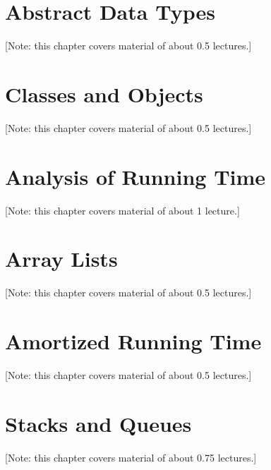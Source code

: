 \documentclass{book}
\begin{document}
\chapter{Abstract Data Types}
\label{chap:ADTs}
[Note: this chapter covers material of about 0.5 lectures.]

%

\chapter{Classes and Objects}
\label{chap:classes}
[Note: this chapter covers material of about 0.5 lectures.]

%

\chapter{Analysis of Running Time}
\label{chap:running-time}
[Note: this chapter covers material of about 1 lecture.]

%

\chapter{Array Lists}
\label{chap:arraylists}
[Note: this chapter covers material of about 0.5 lectures.]

%

\chapter{Amortized Running Time}
\label{chap:amortized}
[Note: this chapter covers material of about 0.5 lectures.]

%

\chapter{Stacks and Queues}
\label{chap:stacksqueues}
[Note: this chapter covers material of about 0.75 lectures.]
\end{document}
